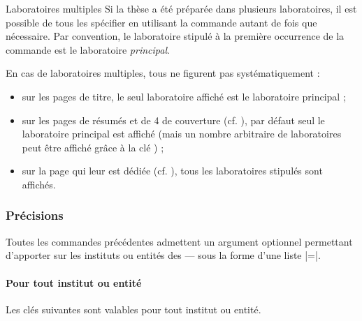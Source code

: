 \begin{dbremark}{Laboratoires multiples}{}
  Si la thèse a été préparée dans plusieurs laboratoires, il est possible de
  tous les spécifier en utilisant la commande  autant de
  fois que nécessaire. Par convention, le laboratoire stipulé à la première
   occurrence de la commande
   est le laboratoire \emph{principal}.

  En cas de laboratoires multiples, tous ne figurent pas systématiquement :
  \begin{itemize}
  \item sur les pages de titre, le seul laboratoire affiché est le
    laboratoire principal ;
  \item sur les pages de résumés et de 4\ieme{} de couverture
    (cf. ), par défaut seul le laboratoire
    principal est affiché (mais un nombre arbitraire de laboratoires peut être
    affiché grâce à la clé ) ;
  \item sur la page  qui leur est dédiée
    (cf. ), tous les laboratoires stipulés sont
    affichés.
  \end{itemize}
\end{dbremark}

\subsubsection{Précisions}
%

Toutes les commandes précédentes admettent un argument optionnel permettant
d'apporter sur les instituts ou entités des  --- sous la forme
d'une liste |=|.
%
\paragraph{Pour tout institut ou entité}

Les clés suivantes\syntaxeoptions{} sont valables pour tout institut ou entité.

